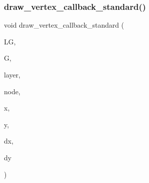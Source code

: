 \subsubsection{\texorpdfstring{draw\+\_\+vertex\+\_\+callback\+\_\+standard()}{draw\_vertex\_callback\_standard()}}
{\footnotesize\ttfamily void draw\+\_\+vertex\+\_\+callback\+\_\+standard (\begin{DoxyParamCaption}\item[{\mbox{\hyperlink{classlayered__graph}{layered\+\_\+graph}} $\ast$}]{LG,  }\item[{\mbox{\hyperlink{classmp__graphics}{mp\+\_\+graphics}} $\ast$}]{G,  }\item[{\mbox{\hyperlink{galois_8h_a09fddde158a3a20bd2dcadb609de11dc}{I\+NT}}}]{layer,  }\item[{\mbox{\hyperlink{galois_8h_a09fddde158a3a20bd2dcadb609de11dc}{I\+NT}}}]{node,  }\item[{\mbox{\hyperlink{galois_8h_a09fddde158a3a20bd2dcadb609de11dc}{I\+NT}}}]{x,  }\item[{\mbox{\hyperlink{galois_8h_a09fddde158a3a20bd2dcadb609de11dc}{I\+NT}}}]{y,  }\item[{\mbox{\hyperlink{galois_8h_a09fddde158a3a20bd2dcadb609de11dc}{I\+NT}}}]{dx,  }\item[{\mbox{\hyperlink{galois_8h_a09fddde158a3a20bd2dcadb609de11dc}{I\+NT}}}]{dy }\end{DoxyParamCaption})}

\mbox{\label{layered__graph__main_8_c_abbe547a03d8b114e3e28cc9b31a00e2c}} 
